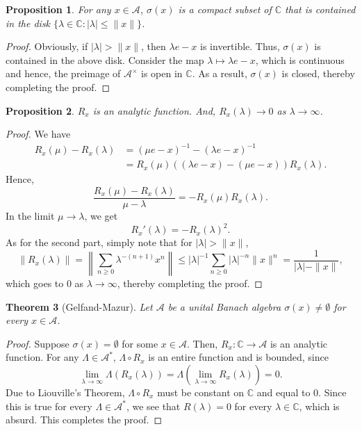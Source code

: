 \documentclass[11pt]{article}
\theoremstyle{thmstyle}
\newtheorem{theorem}{Theorem}[section]
\newtheorem{proposition}[theorem]{Proposition}
\theoremstyle{defstyle}
\newcommand{\bbC}{\mathbb{C}}
\newcommand{\calA}{\mathcal{A}} %
\renewcommand{\le}{\leqslant}
\renewcommand{\ge}{\geqslant}
\begin{document}
\begin{proposition}
    For any $x\in\calA$, $\sigma(x)$ is a compact subset of $\bbC$ that is contained in the disk $\{\lambda\in\bbC\colon |\lambda|\le \|x\|\}$.
\end{proposition}
\begin{proof}
    Obviously, if $|\lambda| > \|x\|$, then $\lambda e - x$ is invertible. Thus, $\sigma(x)$ is contained in the above disk. Consider the map $\lambda\mapsto\lambda e - x$, which is continuous and hence, the preimage of $\calA^\times$ is open in $\bbC$. As a result, $\sigma(x)$ is closed, thereby completing the proof.
\end{proof}

\begin{proposition}
    $R_x$ is an analytic function. And, $R_x(\lambda)\to 0$ as $\lambda\to\infty$.
\end{proposition}
\begin{proof}
    We have 
    \begin{align*}
        R_x(\mu) - R_x(\lambda) &= (\mu e - x)^{-1} - (\lambda e - x)^{-1}\\
        &= R_x(\mu)\left((\lambda e - x) - (\mu e - x)\right)R_x(\lambda).
    \end{align*}
    Hence, 
    \begin{equation*}
        \frac{R_x(\mu) - R_x(\lambda)}{\mu - \lambda} = -R_x(\mu)R_x(\lambda).
    \end{equation*}
    In the limit $\mu\to\lambda$, we get 
    \begin{equation*}
        R_x'(\lambda) = - R_x(\lambda)^2.
    \end{equation*}
    As for the second part, simply note that for $|\lambda| > \|x\|$, 
    \begin{equation*}
        \|R_x(\lambda)\| = \left\|\sum_{n\ge 0}\lambda^{-(n + 1)}x^{n}\right\|\le|\lambda|^{-1}\sum_{n\ge 0}|\lambda|^{-n}\|x\|^n = \frac{1}{|\lambda| - \|x\|},
    \end{equation*}
    which goes to $0$ as $\lambda\to\infty$, thereby completing the proof.
\end{proof}

\begin{theorem}[Gelfand-Mazur]
    Let $\calA$ be a unital Banach algebra $\sigma(x)\ne\emptyset$ for every $x\in\calA$.
\end{theorem}
\begin{proof}
    Suppose $\sigma(x) = \emptyset$ for some $x\in\calA$. Then, $R_x:\bbC\to\calA$ is an analytic function. For any $\Lambda\in\calA^\ast$, $\Lambda\circ R_x$ is an entire function and is bounded, since 
    \begin{equation*}
        \lim_{\lambda\to\infty}\Lambda(R_x(\lambda)) = \Lambda\left(\lim_{\lambda\to\infty} R_x(\lambda)\right) = 0.
    \end{equation*}
    Due to Liouville's Theorem, $\Lambda\circ R_x$ must be constant on $\bbC$ and equal to $0$. Since this is true for every $\Lambda\in\calA^\ast$, we see that $R(\lambda) = 0$ for every $\lambda\in\bbC$, which is absurd. This completes the proof.
\end{proof}
\end{document}
